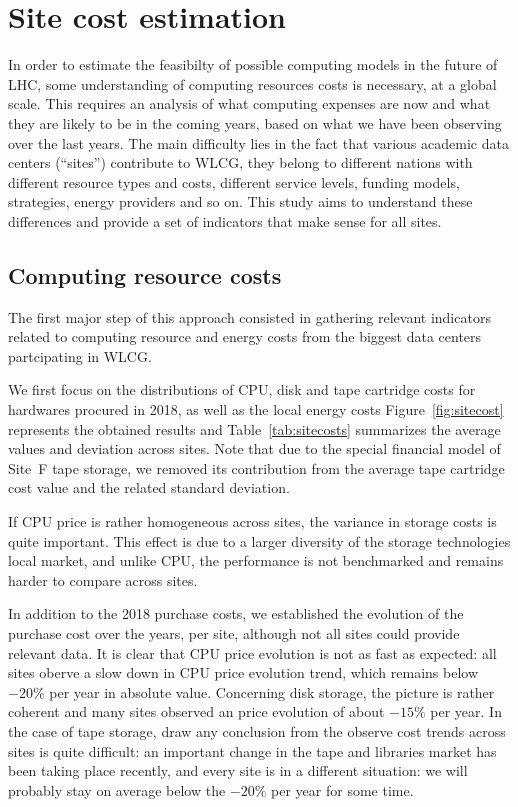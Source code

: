 \section{Site cost estimation}

In order to estimate the feasibilty of possible computing models in the future of LHC, some understanding
of computing resources costs is necessary, at a global scale.
This requires an analysis of what computing expenses are now and what they are likely to be in the coming years, based on
what we have been observing over the last years.
The main difficulty lies in the fact that various academic data centers (``sites'') contribute to WLCG, they belong
to different nations with different resource types and costs, different service levels, funding models,
strategies, energy providers and so on. This study aims to understand these differences and provide a set of indicators
that make sense for all sites.


\subsection{\label{sec:sitecost:computing}Computing resource costs}

The first major step of this approach consisted in gathering relevant indicators related to computing resource and energy costs
from the biggest data centers partcipating in WLCG.

We first focus on the distributions of CPU, disk and tape cartridge costs for hardwares procured in 2018, as well as the
local energy costs
Figure~\ref{fig:sitecost} represents the obtained results and Table~\ref{tab:sitecosts} summarizes the average values
and deviation across sites. Note that due to the special financial model of Site~F tape storage, we removed its contribution
from the average tape cartridge cost value and the related standard deviation.

If CPU price is rather homogeneous across sites, the variance
in storage costs is quite important. This effect is due to a larger diversity of the storage technologies local market,
and unlike CPU, the performance is not benchmarked and remains harder to compare across sites.

In addition to the 2018 purchase costs, we established the evolution of the purchase cost over the years, per site,
although not all sites could provide relevant data. It is clear that CPU price evolution is not as fast as expected: all
sites oberve a slow down in CPU price evolution trend, which remains below $-20 \%$ per year in absolute value.
Concerning disk storage, the picture is rather coherent and many sites
observed an price evolution of about $-15 \%$ per year.
In the case of tape storage, draw any conclusion from the observe cost trends across sites is quite difficult:
an important change in the tape and libraries market has been taking place recently, and every site is in a different
situation: we will probably stay on average below the $-20 \%$ per year for some time.

